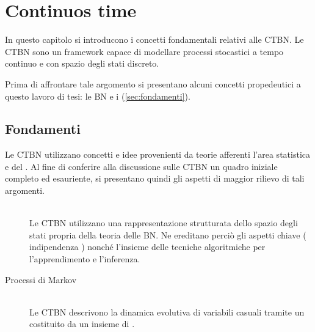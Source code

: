 
\chapter{Continuos time \bn{}}
\label{cap:ctbn}
\acresetall
In questo capitolo si introducono i concetti fondamentali relativi alle \ac{CTBN}. Le \acs{CTBN} sono un framework capace di modellare processi stocastici a tempo continuo e con spazio degli stati discreto.

Prima di affrontare tale argomento si presentano alcuni concetti propedeutici a questo lavoro di tesi: le \ac{BN} e i \mprocess{} (\autoref{sec:fondamenti}).
\section{Fondamenti}
\label{sec:fondamenti}
Le \acl{CTBN} utilizzano concetti e idee provenienti da teorie afferenti l'area statistica e del . Al fine di conferire alla discussione sulle \acs{CTBN} un quadro iniziale completo ed esauriente, si presentano quindi gli aspetti di maggior rilievo di tali argomenti.
\begin{description}
\item[\bn{}] \hfill \\
Le \acl{CTBN} utilizzano una rappresentazione strutturata dello spazio degli stati propria della teoria delle \acl{BN}. Ne ereditano perciò gli aspetti chiave (\eg{} indipendenza \cond*{}) nonché l'insieme delle tecniche algoritmiche per l'apprendimento e l'inferenza.
\item[Processi di Markov]\label{sec:fondamenti-mp}\hfill \\
Le \acl{CTBN} descrivono la dinamica evolutiva di variabili casuali tramite un \mprocess*{} \omog*{} costituito da un insieme di \mprocess{} \cond{}.
\end{description}

